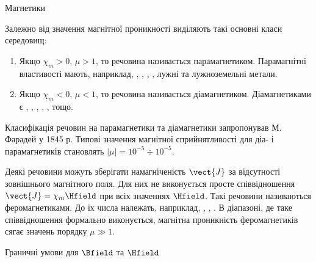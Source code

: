 \documentclass{beamer}
\begin{document}
\begin{frame}{Магнетики}{}\small
	\begin{block}{}\justifying
		Залежно від значення магнітної проникності виділяють такі основні класи середовищ:
		\begin{enumerate}
			\item Якщо $\chi_m > 0$, $\mu > 1$, то речовина називається \alert{парамагнетиком}. Парамагнітні властивості мають, наприклад,
			      \href{https://en.wikipedia.org/wiki/Aluminium}{},
			      \href{https://en.wikipedia.org/wiki/Platinum}{},
			      \href{https://en.wikipedia.org/wiki/Iron(II)\_chloride}{},
			      \href{https://en.wikipedia.org/wiki/Oxygen}{},
			      лужні та лужноземельні метали.

			\item Якщо $\chi_m < 0$, $\mu < 1$, то речовина називається \alert{діамагнетиком}. Діамагнетиками  є
			      \href{https://en.wikipedia.org/wiki/Bismuth}{},
			      \href{https://en.wikipedia.org/wiki/Antimony}{},
			      \href{https://en.wikipedia.org/wiki/Silicon}{},
			      \href{https://en.wikipedia.org/wiki/Water}{},
			      \href{https://en.wikipedia.org/wiki/Dihydrogen}{},
			      \href{https://en.wikipedia.org/wiki/Nitrogen}{} тощо.
		\end{enumerate}
		Класифікація речовин на парамагнетики та діамагнетики запропонував М. Фарадей у 1845 р. Типові значення магнітної сприйнятливості для діа- і
		парамагнетиків становлять $|\mu| = 10^{-5} \div 10^{-5}$.
	\end{block}
	\vspace*{-1em}
	\begin{block}{}\justifying\footnotesize
		Деякі речовини можуть зберігати намагніченість $\vect{J}$ за відсутності зовнішнього магнітного поля. Для них не виконується просте співвідношення
		$\vect{J} = \chi_m\Hfield$ при всіх значеннях $\Hfield$. Такі речовини називаються \alert{феромагнетиками}. До їх числа належать, наприклад, ,
		, . В діапазоні, де таке співвідношення формально виконується, магнітна проникність феромагнетиків сягає значень порядку $\mu
			\gg 1$.
	\end{block}
\end{frame}





\begin{frame}{Граничні умови для $\Bfield$ та $\Hfield$}{}

\end{frame}
\end{document}
